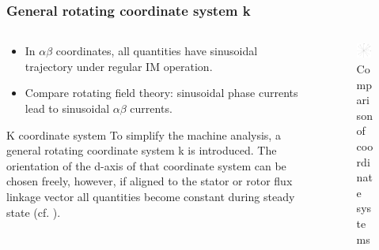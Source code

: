 \begin{frame}
	\frametitle{General rotating coordinate system k}
    \begin{columns}
		\begin{column}{0.55\textwidth}
	       \begin{itemize}
            \item In $\alpha\beta$ coordinates, all quantities have sinusoidal trajectory under regular IM operation.
            \item Compare rotating field theory: sinusoidal phase currents lead to sinusoidal $\alpha\beta$ currents.
           \end{itemize}
           \vspace{-0.4cm}
           \begin{varblock}{K coordinate system}
              To simplify the machine analysis, a general rotating coordinate system k is introduced. The orientation of the d-axis of that coordinate system can be chosen freely, however, if aligned to the stator or rotor flux linkage vector all quantities become constant during steady state (cf.  ).
           \end{varblock}
        \end{column}
        \begin{column}{0.45\textwidth}
            \begin{figure}
                \centering
                \includegraphics[width=0.85\textwidth]{fig/lec06/K_coordinates.pdf}
                \caption{Comparison of coordinate systems}
                \label{fig:K_coordinates}
            \end{figure}
        \end{column}
    \end{columns}
\end{frame}